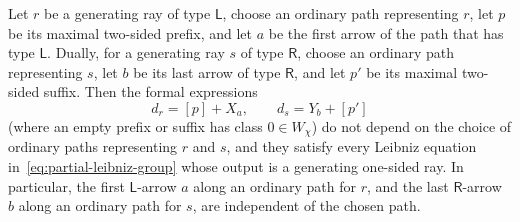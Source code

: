 \begin{lemma}
\label{lem:one-sided-path-coefficients}
Let $r$ be a generating ray of type $\mathsf L$, choose an ordinary path representing $r$, let $p$ be its maximal two-sided prefix, and let $a$ be the first arrow of the path that has type $\mathsf L$. Dually, for a generating ray $s$ of type $\mathsf R$, choose an ordinary path representing $s$, let $b$ be its last arrow of type $\mathsf R$, and let $p'$ be its maximal two-sided suffix. Then the formal expressions
\begin{equation}
  d_r=[p]+X_a,\qquad d_s=Y_b+[p']
  \label{eq:one-sided-path-coefficients}
\end{equation}
(where an empty prefix or suffix has class $0\in W_\chi$) do not depend on the choice of ordinary paths representing $r$ and $s$, and they satisfy every Leibniz equation in~\eqref{eq:partial-leibniz-group} whose output is a generating one-sided ray. In particular, the first $\mathsf L$-arrow $a$ along an ordinary path for $r$, and the last $\mathsf R$-arrow $b$ along an ordinary path for $s$, are independent of the chosen path.
\end{lemma}
